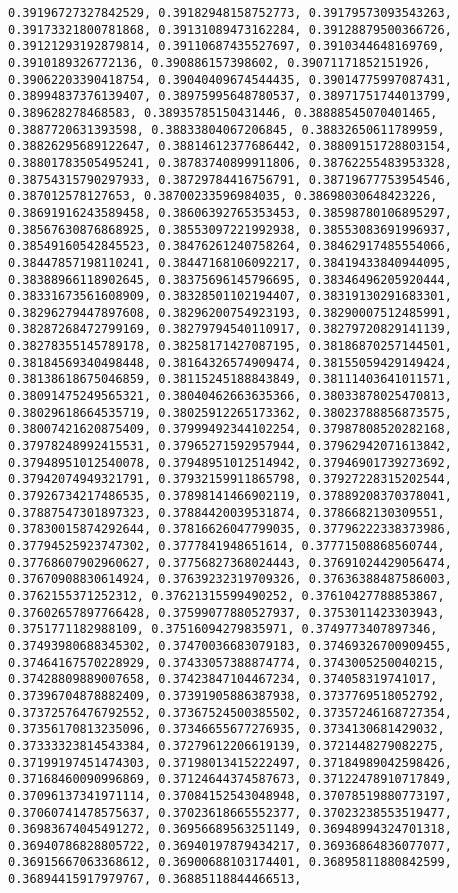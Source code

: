 \documentclass[11pt]{article}
\begin{document}
\begin{Verbatim}[commandchars=\\\{\}]
0.39196727327842529, 0.39182948158752773, 0.39179573093543263, 0.39173321800781868, 0.39131089473162284, 0.39128879500366726, 0.39121293192879814, 0.39110687435527697, 0.3910344648169769, 0.3910189326772136, 0.390886157398602, 0.39071171852151926, 0.39062203390418754, 0.39040409674544435, 0.39014775997087431, 0.38994837376139407, 0.38975995648780537, 0.38971751744013799, 0.389628278468583, 0.38935785150431446, 0.38888545070401465, 0.3887720631393598, 0.38833804067206845, 0.38832650611789959, 0.38826295689122647, 0.38814612377686442, 0.38809151728803154, 0.38801783505495241, 0.38783740899911806, 0.38762255483953328, 0.38754315790297933, 0.38729784416756791, 0.38719677753954546, 0.387012578127653, 0.38700233596984035, 0.38698030648423226, 0.38691916243589458, 0.38606392765353453, 0.38598780106895297, 0.38567630876868925, 0.38553097221992938, 0.38553083691996937, 0.38549160542845523, 0.38476261240758264, 0.38462917485554066, 0.38447857198110241, 0.38447168106092217, 0.38419433840944095, 0.38388966118902645, 0.38375696145796695, 0.38346496205920444, 0.38331673561608909, 0.38328501102194407, 0.38319130291683301, 0.38296279447897608, 0.38296200754923193, 0.38290007512485991, 0.38287268472799169, 0.38279794540110917, 0.38279720829141139, 0.38278355145789178, 0.38258171427087195, 0.38186870257144501, 0.38184569340498448, 0.38164326574909474, 0.38155059429149424, 0.38138618675046859, 0.38115245188843849, 0.38111403641011571, 0.38091475249565321, 0.38040462663635366, 0.38033878025470813, 0.38029618664535719, 0.38025912265173362, 0.38023788856873575, 0.38007421620875409, 0.37999492344102254, 0.37987808520282168, 0.37978248992415531, 0.37965271592957944, 0.37962942071613842, 0.37948951012540078, 0.37948951012514942, 0.37946901739273692, 0.37942074949321791, 0.37932159911865798, 0.37927228315202544, 0.37926734217486535, 0.37898141466902119, 0.37889208370378041, 0.37887547301897323, 0.37884420039531874, 0.3786682130309551, 0.37830015874292644, 0.37816626047799035, 0.37796222338373986, 0.37794525923747302, 0.3777841948651614, 0.37771508868560744, 0.37768607902960627, 0.37756827368024443, 0.37691024429056474, 0.37670908830614924, 0.37639232319709326, 0.37636388487586003, 0.3762155371252312, 0.37621315599490252, 0.37610427788853867, 0.37602657897766428, 0.37599077880527937, 0.3753011423303943, 0.3751771182988109, 0.37516094279835971, 0.3749773407897346, 0.37493980688345302, 0.37470036683079183, 0.37469326700909455, 0.37464167570228929, 0.37433057388874774, 0.3743005250040215, 0.37428809889007658, 0.37423847104467234, 0.374058319741017, 0.37396704878882409, 0.37391905886387938, 0.3737769518052792, 0.37372576476792552, 0.37367524500385502, 0.37357246168727354, 0.37356170813235096, 0.37346655677276935, 0.3734130681429032, 0.37333323814543384, 0.37279612206619139, 0.3721448279082275, 0.37199197451474303, 0.37198013415222497, 0.37184989042598426, 0.37168460090996869, 0.37124644374587673, 0.37122478910717849, 0.37096137341971114, 0.37084152543048948, 0.37078519880773197, 0.37060741478575637, 0.37023618665552377, 0.37023238553519477, 0.36983674045491272, 0.36956689563251149, 0.36948994324701318, 0.36940786828805722, 0.36940197879434217, 0.36936864836077077, 0.36915667063368612, 0.36900688103174401, 0.36895811880842599, 0.36894415917979767, 0.36885118844466513, 
\end{Verbatim}
\end{document}
